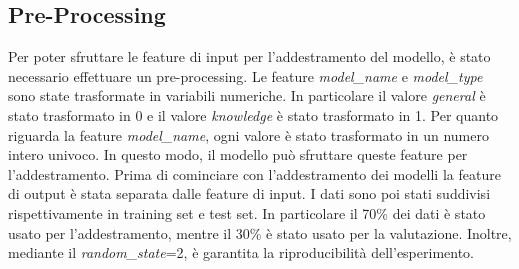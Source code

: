 \subsection{Pre-Processing}

Per poter sfruttare le feature di input per l'addestramento del modello, è stato necessario effettuare un pre-processing. Le feature \textit{model\_name} e \textit{model\_type} sono state trasformate in variabili numeriche. In particolare il valore \textit{general} è stato trasformato in 0 e il valore \textit{knowledge} è stato trasformato in 1.
Per quanto riguarda la feature \textit{model\_name}, ogni valore è stato trasformato in un numero intero univoco. In questo modo, il modello può sfruttare queste feature per l'addestramento.
Prima di cominciare con l'addestramento dei modelli la feature di output è stata separata dalle feature di input. I dati sono poi stati suddivisi rispettivamente in training set e test set. In particolare il 70\% dei dati è stato usato per l'addestramento, mentre il 30\% è stato usato per la valutazione. Inoltre, mediante il \textit{random\_state}=2, è garantita la riproducibilità dell'esperimento.

